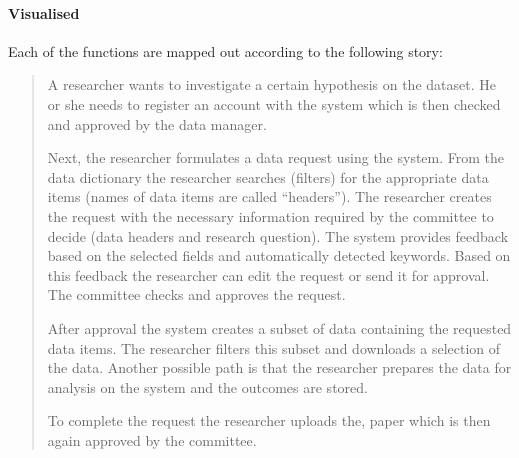 

\paragraph{Visualised}

Each of the functions are mapped out according to the following story:

\begin{quotation}
	\noindent A researcher wants to investigate a certain hypothesis on the \project{} dataset.
	He or she needs to register an account with the system which is then checked and approved by the data manager.
	
	Next, the researcher formulates a data request using the system.
	From the data dictionary the researcher searches (filters) for the appropriate data items (names of data items are called ``headers'').
	The researcher creates the request with the necessary information required by the committee to decide (data headers and research question).
	The system provides feedback based on the selected fields and automatically detected keywords.
	Based on this feedback the researcher can edit the request or send it for approval.
	The committee checks and approves the request.
	
	After approval the system creates a subset of \project{} data containing the requested data items.
	The researcher filters this subset and downloads a selection of the data.
	Another possible path is that the researcher prepares the data for analysis on the system and the outcomes are stored.
	
	To complete the request the researcher uploads the, paper which is then again approved by the committee.
\end{quotation}

